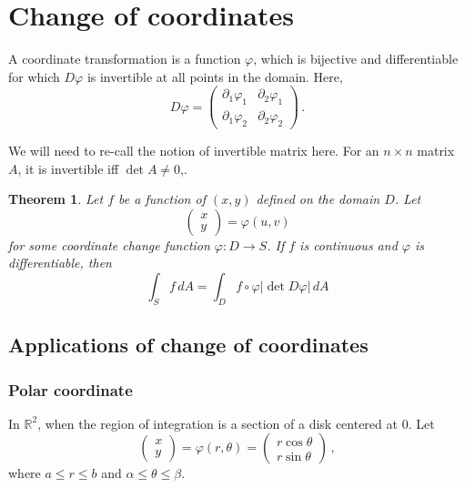 \documentclass[
]{book}
\newtheorem{theorem}{Theorem}[chapter]
\theoremstyle{definition}
\theoremstyle{definition}
\theoremstyle{definition}
\theoremstyle{definition}
\theoremstyle{remark}
\begin{document}
\hypertarget{change-of-coordinates}{%
\section{Change of coordinates}\label{change-of-coordinates}}

A coordinate transformation is a function \(\varphi\), which
is bijective and differentiable for which \(D\varphi\) is
invertible at all points in the domain.
Here,
\begin{equation*}
    D\varphi = 
    \begin{pmatrix}
        \partial_1 \varphi_1 & \partial_2 \varphi_1 \\
        \partial_1 \varphi_2 & \partial_2 \varphi_2 
    \end{pmatrix} \,.
\end{equation*}

We will need to re-call the notion of invertible matrix here.
For an \(n\times n\) matrix \(A\), it is invertible iff \(\det A \not= 0\),.

\begin{theorem}
Let \(f\) be a function of \((x,y)\) defined on the domain \(D\).
Let
\begin{equation*}
    \begin{pmatrix}
        x \\ y
    \end{pmatrix}
     = \varphi(u,v)
\end{equation*}
for some coordinate change function \(\varphi: D \to S\).
If \(f\) is continuous and \(\varphi\) is differentiable, then
\begin{equation*}
    \int_S f \, dA = \int_D f\circ \varphi |\det D \varphi| \, dA
\end{equation*}
\end{theorem}

\hypertarget{applications-of-change-of-coordinates}{%
\subsection{Applications of change of coordinates}\label{applications-of-change-of-coordinates}}

\hypertarget{polar-coordinate}{%
\subsubsection{Polar coordinate}\label{polar-coordinate}}

In \(\mathbb{R}^2\),
when the region of integration is a section of a disk centered at \(0\).
Let
\begin{equation*}
    \begin{pmatrix}
        x \\ y
    \end{pmatrix}
    =
    \varphi(r,\theta) = 
    \begin{pmatrix}
        r\cos\theta \\
        r\sin\theta 
    \end{pmatrix} \,,
\end{equation*}
where \(a \leq r \leq b\) and \(\alpha \leq \theta \leq \beta\).
\end{document}
